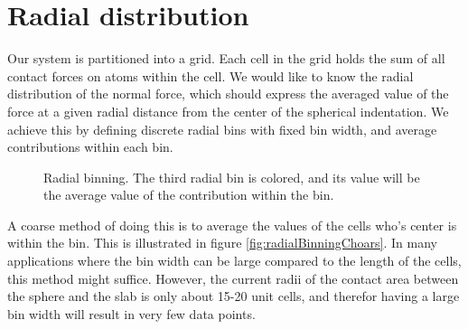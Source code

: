 \documentclass[twoside,english]{uiofysmaster}
\begin{document}

%

\newpage


\section{Radial distribution}
Our system is partitioned into a grid. 
Each cell in the grid holds the sum of all contact forces on atoms within the cell. 
We would like to know the radial distribution of the normal force, which should express the averaged value of the force at a given radial distance from the center of the spherical indentation.
We achieve this by defining discrete radial bins with fixed bin width, and average contributions within each bin.
\begin{figure}
	\centering
	\resizebox{0.4\linewidth}{!}{
		
	}
	\caption{Radial binning. The third radial bin is colored, and its value will be the average value of the contribution within the bin.}%
	\label{fig:radialBinningSmooth}
\end{figure}
A coarse method of doing this is to average the values of the cells who's center is within the bin. 
This is illustrated in figure \ref{fig:radialBinningChoars}. 
In many applications where the bin width can be large compared to the length of the cells, this method might suffice.
However, the current radii of the contact area between the sphere and the slab is only about 15-20 unit cells, and therefor having a large bin width will result in very few data points. 
\end{document}
